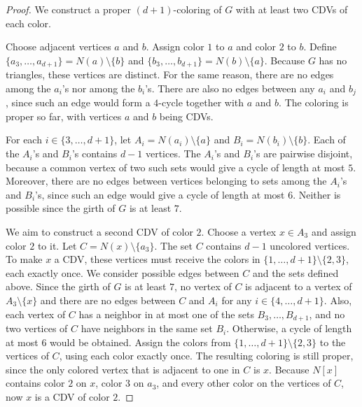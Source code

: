 \documentclass{article}
\theoremstyle{definition}
\begin{document}
\begin{proof}
We construct a proper $(d+1)$-coloring of $G$ with at least two CDVs of each color.

Choose adjacent vertices $a$ and $b$. Assign color $1$ to $a$ and color $2$ to $b$. Define $\{a_3,\ldots,a_{d+1}\}=N(a)\setminus\{b\}$ and $\{b_3,\ldots,b_{d+1}\}=N(b)\setminus\{a\}$.
Because $G$ has no triangles, these vertices are distinct.
For the same reason, there are no edges among the $a_i$'s nor among the $b_i$'s.
There are also no edges between any $a_i$ and $b_j$, since such an edge would form a $4$-cycle together with $a$ and $b$.
The coloring is proper so far, with vertices $a$ and $b$ being CDVs.

For each $i\in\{3,\ldots,d+1\}$, let $A_i=N(a_i)\setminus\{a\}$ and $B_i=N(b_i)\setminus\{b\}$.
Each of the $A_i$'s and $B_i$'s contains $d-1$ vertices.
The $A_i$'s and $B_i$'s are pairwise disjoint, because a common vertex of two such sets would give a cycle of length at most $5$.
Moreover, there are no edges between vertices belonging to sets among the $A_i$'s and $B_i$'s, since such an edge would give a cycle of length at most $6$.
Neither is possible since the girth of $G$ is at least $7$.

We aim to construct a second CDV of color $2$. Choose a vertex $x\in A_3$ and assign color $2$ to it. Let $C=N(x)\setminus\{a_3\}$. The set $C$ contains $d-1$ uncolored vertices. To make $x$ a CDV, these vertices must receive the colors in $\{1,\ldots,d+1\}\setminus\{2,3\}$,
each exactly once.
We consider possible edges between $C$ and the sets defined above.
Since the girth of $G$ is at least $7$, no vertex of $C$ is adjacent to a vertex of $A_3\setminus\{x\}$ and there are no edges between $C$ and $A_i$ for any $i\in\{4,\ldots,d+1\}$.
Also, each vertex of $C$ has a neighbor in at most one of the sets $B_3,\ldots,B_{d+1}$, and no two vertices of $C$ have neighbors in the same set $B_i$. Otherwise, a cycle of length at most $6$ would be obtained. 
Assign the colors from $\{1,\ldots,d+1\}\setminus\{2,3\}$ to the vertices of $C$, using each color exactly once.
The resulting coloring is still proper, since the only colored vertex that is adjacent to one in $C$ is $x$.
Because $N[x]$ contains color $2$ on $x$, color $3$ on $a_3$, and every other color on the vertices of $C$, now $x$ is a CDV of color $2$.


\end{proof}
\end{document}

